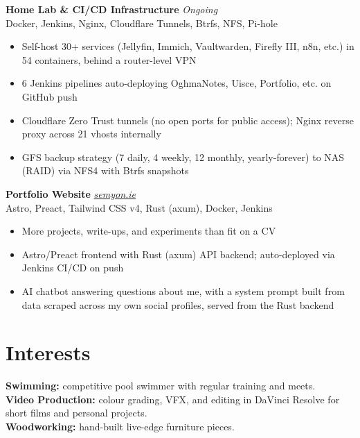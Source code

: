 \documentclass[11pt]{article}
\newcommand{\cventry}[4]{%
  \noindent\textbf{\large #1} \hfill \emph{#2}\\
  {\color{secondary}#3} \hfill {\color{secondary}#4}%
}
\begin{document}
\vspace{5pt}
\cventry{Home Lab \& CI/CD Infrastructure}{Ongoing}
        {Docker, Jenkins, Nginx, Cloudflare Tunnels, Btrfs, NFS, Pi-hole}{}
\begin{itemize}
  \item Self-host 30+ services (Jellyfin, Immich, Vaultwarden, Firefly III, n8n, etc.) in 54 containers, behind a router-level VPN
  \item 6 Jenkins pipelines auto-deploying OghmaNotes, Uisce, Portfolio, etc. on GitHub push
  \item Cloudflare Zero Trust tunnels (no open ports for public access); Nginx reverse proxy across 21 vhosts internally
  \item GFS backup strategy (7 daily, 4 weekly, 12 monthly, yearly-forever) to NAS (RAID) via NFS4 with Btrfs snapshots
\end{itemize}

\vspace{5pt}
\cventry{Portfolio Website}{\href{https://semyon.ie}{semyon.ie}}
        {Astro, Preact, Tailwind CSS v4, Rust (axum), Docker, Jenkins}{}
\begin{itemize}
  \item More projects, write-ups, and experiments than fit on a CV
  \item Astro/Preact frontend with Rust (axum) API backend; auto-deployed via Jenkins CI/CD on push
  \item AI chatbot answering questions about me, with a system prompt built from data scraped across my own social profiles, served from the Rust backend
\end{itemize}

\section*{Interests}
\noindent\textbf{Swimming:} competitive pool swimmer with regular training and meets.\\[3pt]
\textbf{Video Production:} colour grading, VFX, and editing in DaVinci Resolve for short films and personal projects.\\[3pt]
\textbf{Woodworking:} hand-built live-edge furniture pieces.
\end{document}
